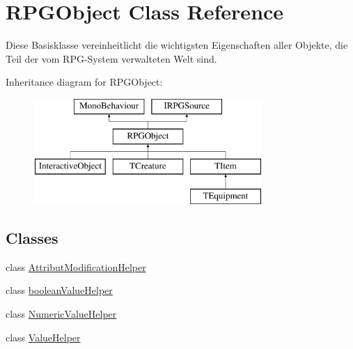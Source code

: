 \hypertarget{class_r_p_g_object}{}\section{R\+P\+G\+Object Class Reference}
\label{class_r_p_g_object}


Diese Basisklasse vereinheitlicht die wichtigsten Eigenschaften aller Objekte, die Teil der vom R\+P\+G-\/\+System verwalteten Welt sind.  


Inheritance diagram for R\+P\+G\+Object\+:\begin{figure}[H]
\begin{center}
\leavevmode
\includegraphics[height=4.000000cm]{class_r_p_g_object}
\end{center}
\end{figure}
\subsection*{Classes}
\begin{DoxyCompactItemize}
\item 
class \hyperlink{class_r_p_g_object_1_1_attribut_modification_helper}{Attribut\+Modification\+Helper}
\item 
class \hyperlink{class_r_p_g_object_1_1boolean_value_helper}{boolean\+Value\+Helper}
\item 
class \hyperlink{class_r_p_g_object_1_1_numeric_value_helper}{Numeric\+Value\+Helper}
\item 
class \hyperlink{class_r_p_g_object_1_1_value_helper}{Value\+Helper}
\end{DoxyCompactItemize}
